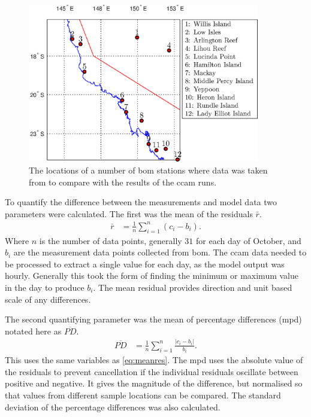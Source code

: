 \begin{figure}[!htb]
    \centering
    \includegraphics[width=0.9\textwidth]{Fig/Research/BomLocationsFinal2.eps}
    \caption{The locations of a number of \gls{bom} stations where data was taken from to compare with the results of the \gls{ccam} runs. }
    \label{fig:bomlocsplot}
\end{figure}

To quantify the difference between the measurements and model data two parameters were calculated. The first was the mean of the residuals $\bar{r}$. 
\begin{align}
	\label{eq:meanres}
	\bar{r} &= \frac{1}{n} \sum_{i=1}^n \left( c_i - b_i \right).
\end{align}
Where $n$ is the number of data points, generally $31$ for each day of October, and $b_i$ are the measurement data points collected from \gls{bom}. The \gls{ccam} data needed to be processed to extract a single value for each day, as the model output was hourly. Generally this took the form of finding the minimum or maximum value in the day to produce $b_i$. The mean residual provides direction and unit based scale of any differences.

The second quantifying parameter was the mean of percentage differences (\gls{mpd}) notated here as $\overline{PD}$.
\begin{align}
	\label{eq:meanpd}
	\overline{PD} &= \frac{1}{n} \sum_{i=1}^n \frac{\left| c_i - b_i \right|}{b_i}.
\end{align}
This uses the same variables as \cref{eq:meanres}. The \gls{mpd} uses the absolute value of the residuals to prevent cancellation if the individual residuals oscillate between positive and negative. It gives the magnitude of the difference, but normalised so that values from different sample locations can be compared. The standard deviation of the percentage differences was also calculated.

